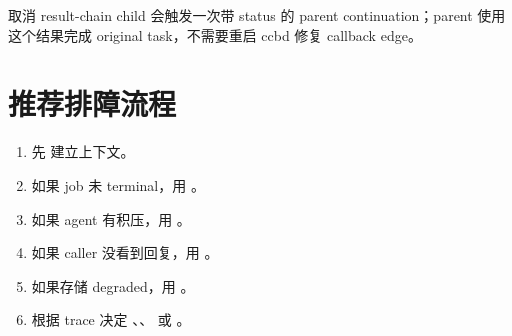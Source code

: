 取消 result-chain child 会触发一次带  status 的 parent
continuation；parent 使用这个结果完成 original task，不需要重启 ccbd 修复
callback edge。

\section{推荐排障流程}

\begin{enumerate}
  \item 先  建立上下文。
  \item 如果 job 未 terminal，用 。
  \item 如果 agent 有积压，用 。
  \item 如果 caller 没看到回复，用 。
  \item 如果存储 degraded，用 。
  \item 根据 trace 决定 、、 或 。
\end{enumerate}
